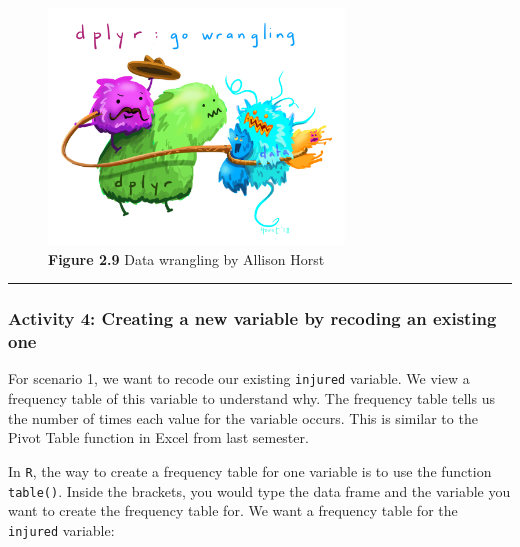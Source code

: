\documentclass[
]{book}
\newenvironment{Shaded}{\begin{snugshade}}{\end{snugshade}}
\newcommand{\FunctionTok}[1]{\textcolor[rgb]{0.00,0.00,0.00}{#1}}
\newcommand{\NormalTok}[1]{#1}
\newcommand{\SpecialCharTok}[1]{\textcolor[rgb]{0.00,0.00,0.00}{#1}}
\begin{document}
\begin{figure}
\centering
\includegraphics[width=0.7\textwidth,height=\textheight]{Images/dplyr_wrangling.png}
\caption{\textbf{Figure 2.9} Data wrangling by Allison Horst}
\end{figure}

\begin{center}\rule{0.5\linewidth}{0.5pt}\end{center}

\hypertarget{activity-4-creating-a-new-variable-by-recoding-an-existing-one}{%
\subsubsection{Activity 4: Creating a new variable by recoding an existing one}\label{activity-4-creating-a-new-variable-by-recoding-an-existing-one}}

For scenario 1, we want to recode our existing \texttt{injured} variable. We view a frequency table of this variable to understand why. The frequency table tells us the number of times each value for the variable occurs. This is similar to the Pivot Table function in Excel from last semester.

In \texttt{R}, the way to create a frequency table for one variable is to use the function \texttt{table()}. Inside the brackets, you would type the data frame and the variable you want to create the frequency table for. We want a frequency table for the \texttt{injured} variable:

\begin{Shaded}
\end{Shaded}
\end{document}
